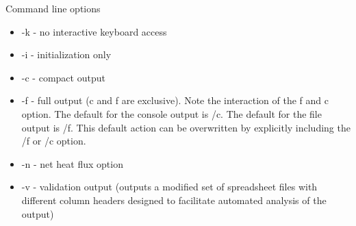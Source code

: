 Command line options

\begin{itemize}
\item -k - no interactive keyboard access
\item -i - initialization only
\item -c - compact output
\item -f - full output (c and f are exclusive). Note the interaction of the f and c option. The default for the console output is /c. The default for the file output is /f. This default action can be overwritten by explicitly including the /f or /c option.
\item -n - net heat flux option
\item -v - validation output (outputs a modified set of spreadsheet files with different column headers designed to facilitate automated analysis of the output)
\end{itemize}


\label{last_page}


